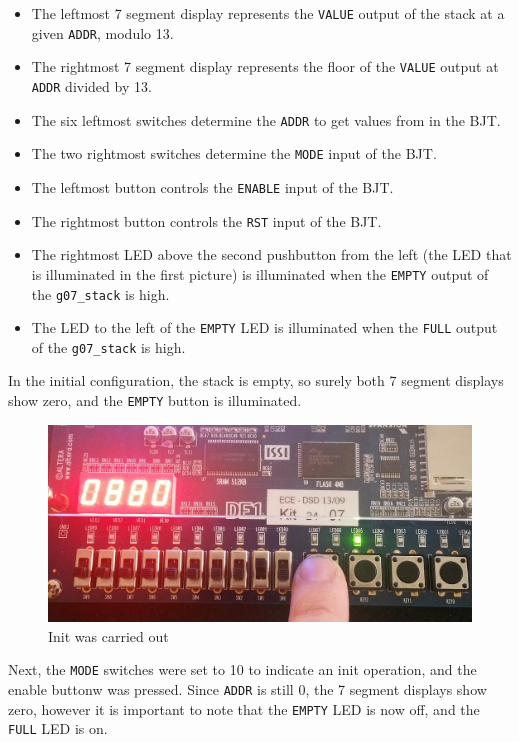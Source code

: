 \documentclass[12pt]{report}
\begin{document}
\begin{itemize}
	\item The leftmost 7 segment display represents the \texttt{VALUE} output of the stack at a
		given \texttt{ADDR}, modulo 13.
	\item The rightmost 7 segment display represents the floor of the \texttt{VALUE} output at
		\texttt{ADDR} divided by 13.
	\item The six leftmost switches determine the \texttt{ADDR} to get values from in the BJT.
	\item The two rightmost switches determine the \texttt{MODE} input of the BJT.
	\item The leftmost button controls the \texttt{ENABLE} input of the BJT.
	\item The rightmost button controls the \texttt{RST} input of the BJT.
	\item The rightmost LED above the second pushbutton from the left (the LED that is illuminated
		in the first picture) is illuminated when the \texttt{EMPTY} output of the
		\texttt{g07\_stack} is high.
	\item The LED to the left of the \texttt{EMPTY} LED is illuminated when the 
		\texttt{FULL} output of the \texttt{g07\_stack} is high.
\end{itemize}
In the initial configuration, the stack is empty, so surely both 7 segment displays show zero, and
the \texttt{EMPTY} button is illuminated.

\begin{figure}[h]
	\begin{center}
		\caption{Init was carried out}
		\includegraphics[scale=0.15]{fpga2}
	\end{center}
\end{figure}
Next, the \texttt{MODE} switches were set to 10 to indicate an init operation, and the enable
buttonw was pressed. Since \texttt{ADDR} is still 0, the 7 segment displays show zero, however it is
important to note that the \texttt{EMPTY} LED is now off, and the \texttt{FULL} LED is on.
\end{document}
